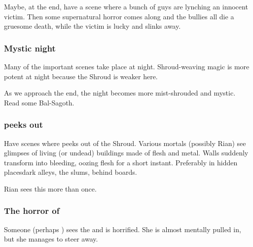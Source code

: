 Maybe, at the end, have a scene where a bunch of guys are lynching an innocent victim. Then some supernatural horror comes along and the bullies all die a gruesome death, while the victim is lucky and slinks away. 






\subsubsection{Mystic night}
Many of the important scenes take place at night.
Shroud-weaving magic is more potent at night because the Shroud is weaker here. 

As we approach the end, the \Malcuric night becomes more mist-shrouded and mystic. 
Read some Bal-Sagoth.





\subsubsection{\Nithdornazsh peeks out}
Have scenes where \Nithdornazsh{} peeks out of the Shroud. 
Various mortals (possibly Rian) see glimpses of living (or undead) buildings made of flesh and metal. 
Walls suddenly transform into bleeding, oozing flesh for a short instant. 
Preferably in hidden places\dash dark alleys, the slums, behind boards.

Rian sees this more than once. 





\subsubsection{The horror of \Nithdornazsh}
Someone (perhaps \MoroCobrel) sees the  and is horrified. 
She is almost mentally pulled in, but she manages to steer away. 

